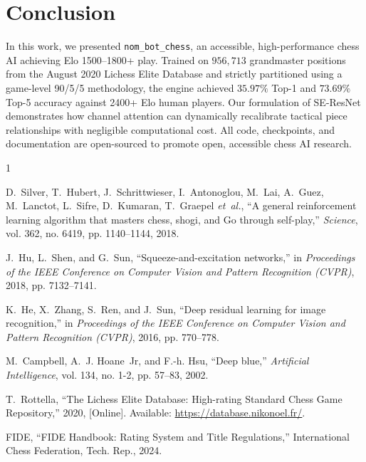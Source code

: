 \documentclass[10pt,journal,compsoc]{IEEEtran}
\begin{document}
\section{Conclusion}
\label{sec:conclusion}
In this work, we presented \texttt{nom\_bot\_chess}, an accessible, high-performance chess AI achieving Elo 1500--1800+ play. Trained on $956,713$ grandmaster positions from the August 2020 Lichess Elite Database and strictly partitioned using a game-level 90/5/5 methodology, the engine achieved $35.97\%$ Top-1 and $73.69\%$ Top-5 accuracy against 2400+ Elo human players. Our formulation of SE-ResNet demonstrates how channel attention can dynamically recalibrate tactical piece relationships with negligible computational cost. All code, checkpoints, and documentation are open-sourced to promote open, accessible chess AI research.


\begin{thebibliography}{1}

D.~Silver, T.~Hubert, J.~Schrittwieser, I.~Antonoglou, M.~Lai, A.~Guez, M.~Lanctot, L.~Sifre, D.~Kumaran, T.~Graepel \emph{et~al.}, ``A general reinforcement learning algorithm that masters chess, shogi, and Go through self-play,'' \emph{Science}, vol. 362, no. 6419, pp. 1140--1144, 2018.

J.~Hu, L.~Shen, and G.~Sun, ``Squeeze-and-excitation networks,'' in \emph{Proceedings of the IEEE Conference on Computer Vision and Pattern Recognition (CVPR)}, 2018, pp. 7132--7141.

K.~He, X.~Zhang, S.~Ren, and J.~Sun, ``Deep residual learning for image recognition,'' in \emph{Proceedings of the IEEE Conference on Computer Vision and Pattern Recognition (CVPR)}, 2016, pp. 770--778.

M.~Campbell, A.~J. Hoane~Jr, and F.-h. Hsu, ``Deep blue,'' \emph{Artificial Intelligence}, vol. 134, no. 1-2, pp. 57--83, 2002.

T.~Rottella, ``The Lichess Elite Database: High-rating Standard Chess Game Repository,'' 2020, [Online]. Available: \url{https://database.nikonoel.fr/}.

FIDE, ``FIDE Handbook: Rating System and Title Regulations,'' International Chess Federation, Tech. Rep., 2024.

\end{thebibliography}
\end{document}
